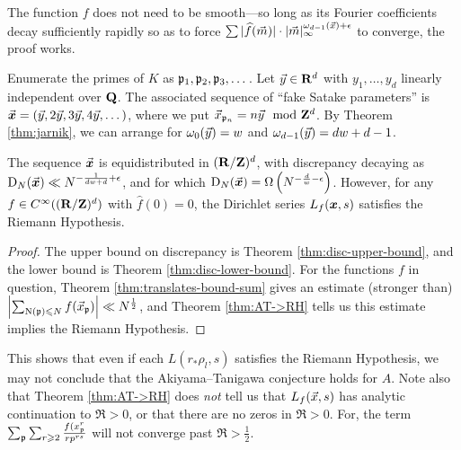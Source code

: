 The function $f$ does not need to be smooth---so long as its Fourier 
coefficients decay sufficiently rapidly so as to force 
$\sum |\widehat f(\vec{m})| \cdot |\vec{m}|_\infty^{\omega_{d-1}(\vec{x})+\epsilon}$ to 
converge, the proof works. 

Enumerate the primes of $K$ as $\mathfrak{p}_1,\mathfrak{p}_2,\mathfrak{p}_3,\dots$.  
Let $\vec{y}\in \mathbf{R}^d$ with $y_1,\dots,y_d$ linearly independent over $\mathbf{Q}$. The 
associated sequence of ``fake Satake parameters'' is 
$\vec{\boldsymbol x} = (\vec{y}, 2\vec{y}, 3 \vec{y}, 4 \vec{y}, \dots)$, 
where we put $\vec{x}_{\mathfrak{p}_n} = n \vec{y}\mod {\mathbf{Z}}^d$. By Theorem \ref{thm:jarnik}, we can 
arrange for $\omega_0(\vec{y}) = w$ and $\omega_{d-1}(\vec{y}) = d w + d - 1$. 

\begin{theorem}
The sequence $\vec{\boldsymbol x}$ is equidistributed in $(\mathbf{R}/\mathbf{Z})^d$, with discrepancy 
decaying as $\operatorname{D}_N(\vec{\boldsymbol x}) \ll N^{-\frac{1}{d w+d} + \epsilon}$, and for which 
$\operatorname{D}_N(\vec{\boldsymbol x}) = \Omega\left(N^{-\frac{d}{w} - \epsilon}\right)$. 
However, for any $f\in C^\infty((\mathbf{R}/\mathbf{Z})^d)$ with $\widehat f(0)=0$, the 
Dirichlet series  $L_f({\boldsymbol x},s)$ satisfies the Riemann Hypothesis. 
\end{theorem}
\begin{proof}
The upper bound on discrepancy is Theorem \ref{thm:disc-upper-bound}, and 
the lower bound is Theorem \ref{thm:disc-lower-bound}. For the functions $f$ in 
question, Theorem \ref{thm:translates-bound-sum} gives an estimate (stronger 
than) $\left| \sum_{\operatorname{N}(\mathfrak{p})\leqslant N} f(\vec{x}_{\mathfrak{p}})\right|\ll N^{\frac 1 2}$, and 
Theorem \ref{thm:AT->RH} tells us this estimate implies the Riemann Hypothesis. 
\end{proof}

This shows that even if each $L(r_\ast \rho_l,s)$ satisfies the Riemann 
Hypothesis, we may not conclude that the Akiyama--Tanigawa 
conjecture holds for $A$. Note also that Theorem \ref{thm:AT->RH} does 
\emph{not} tell us that $L_f(\vec{x},s)$ has analytic continuation to $\Re > 0$, or 
that there are no zeros in $\Re > 0$. For, the term 
$\sum_{\mathfrak{p}} \sum_{r\geqslant 2} \frac{f(x_{\mathfrak{p}}^r}{r p^{r s}}$ will not converge 
past $\Re > \frac 1 2$.
